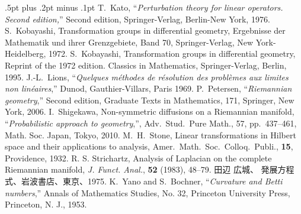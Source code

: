 \makeatletter
\def\section{\@startsection {section}{1}{\z@}{-3.5ex plus -1ex minus 
    -.2ex}{2.3ex plus .2ex}{\center\bf}}
\makeatother
\begin{thebibliography}{99}
\small
\itemsep .5pt plus .2pt minus .1pt
\baselineskip=11.5pt
%
 T.~Kato, %
``{\it Perturbation theory for linear operators. Second edition,\/}''
Second edition, %
Springer-Verlag, Berlin-New York, 1976.
%
 S.~Kobayashi, %
Transformation groups in differential geometry,
Ergebnisse der Mathematik und ihrer Grenzgebiete, Band 70,
Springer-Verlag, New York-Heidelberg, 1972.
%
 S.~Kobayashi, %
Transformation groups in differential geometry,
Reprint of the 1972 edition. Classics in Mathematics,
Springer-Verlag, Berlin, 1995.
%
 J.-L.~Lions, 
``{\it Quelques m\'ethodes de r\'esolution des probl\`emes aux limites non
lin\'eaires\/},'' Dunod, Gauthier-Villars, Paris 1969.
%
 P.~Petersen, %
``{\it Riemannian geometry\/},'' Second edition,
Graduate Texts in Mathematics, 171, Springer, New York, 2006.
%
 I.~Shigekawa, %
Non-symmetric diffusions on a Riemannian manifold,
``{\it Probabilistic approach to geometry\/},'',
Adv.\ Stud.\ Pure Math., 57, pp.~437--461, Math. Soc. Japan, Tokyo, 2010.
%
 M.~H.~Stone,
Linear transformations in Hilbert space and their applications to analysis,
Amer.\ Math.\ Soc.\ Colloq.\ Publi., {\bf 15}, Providence, 1932.
R. S. Strichartz,
Analysis of Laplacian on the complete Riemannian manifold,
{\it J. Funct. Anal.}, {\bf 52} (1983), 48--79.
%
 田辺 広城、
発展方程式、岩波書店、東京、1975.
%
 K.~Yano and S.~Bochner,
``{\it Curvature and Betti numbers\/},''
Annals of Mathematics Studies, No. 32,
Princeton University Press, Princeton, N. J., 1953.
%
\end{thebibliography}
